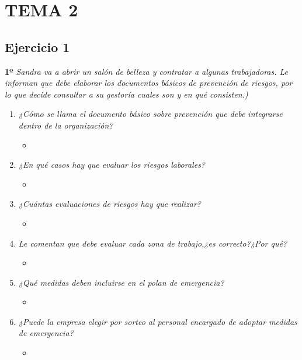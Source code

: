 \documentclass{article}
\begin{document}
    \section{TEMA 2}
      \subsection{Ejercicio 1}
        \textbf{1º} \textit{Sandra va a abrir un salón de belleza y contratar a algunas trabajadoras. Le informan que debe elaborar los documentos básicos de prevención de riesgos, por lo que decide consultar a su 
        gestoría cuales son y en qué consisten.)}
        \\
        \begin{enumerate}[label=(\alph*)]
          \item \textit{¿Cómo se llama el documento básico sobre prevención que debe integrarse dentro de la organización?}
            \begin{itemize}
              \item 
            \end{itemize}
          \item \textit{¿En qué casos hay que evaluar los riesgos laborales?}
            \begin{itemize}
              \item 
            \end{itemize}
          \item \textit{¿Cuántas evaluaciones de riesgos hay que realizar?}
            \begin{itemize}
              \item 
            \end{itemize}
          \item \textit{Le comentan que debe evaluar cada zona de trabajo,¿es correcto?¿Por qué?}
            \begin{itemize}
              \item 
            \end{itemize}
          \item \textit{¿Qué medidas deben incluirse en el polan de emergencia?}
            \begin{itemize}
              \item 
            \end{itemize}
          \item \textit{¿Puede la empresa elegir por sorteo al personal encargado de adoptar medidas de emergencia?}
            \begin{itemize}
              \item
            \end{itemize}
        \end{enumerate}
    \newpage
\end{document}

